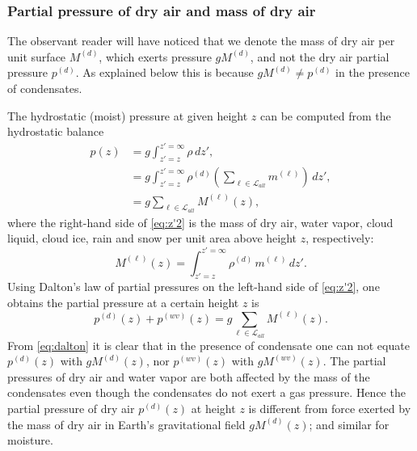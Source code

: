 \documentclass{agujournal}
\begin{document}
{\subsubsection{Partial pressure of dry air and mass of dry air}\label{sec:dryairp}
The observant reader will have noticed that we denote the mass of dry air per unit surface  $M^{(d)}$, which exerts pressure $gM^{(d)}$, and not the dry air partial pressure $p^{(d)}$. As explained below this is because $gM^{(d)}\neq p^{(d)}$ in the presence of condensates. 

The hydrostatic (moist) pressure at given height $z$ can be computed from the hydrostatic balance
\begin{align}
p(z)&=g\int^{z'=\infty}_{z'=z}\rho\, dz',\\
 &=g\int^{z'=\infty}_{z'=z}\rho^{(d)} \left( \sum_{\ell \in \mathcal{L}_{all}} m^{(\ell)} \right)\, dz',\\
 &=g\sum_{\ell \in \mathcal{L}_{all}} M^{(\ell)}(z),\label{eq:z'2}
\end{align}
where the right-hand side of \eqref{eq:z'2} is the mass of dry air, water vapor, cloud liquid, cloud ice, rain and snow per unit area above height $z$, respectively:
\begin{equation}
{M}^{(\ell)}(z)=\int^{z'=\infty}_{z'=z}\rho^{(d)} \, m^{(\ell)} \, dz'\label{eq:z'}.
\end{equation}
Using Dalton's law of partial pressures on the left-hand side of \eqref{eq:z'2}, one obtains the partial pressure at a certain height $z$ is
\begin{equation}
p^{(d)}(z)+p^{(wv)}(z)=g\sum_{\ell \in \mathcal{L}_{all}} {M}^{(\ell)}(z).\label{eq:dalton}
\end{equation}
From \eqref{eq:dalton} it is clear that in the presence of condensate one can not equate $p^{(d)}(z)$ with $g{M}^{(d)}(z)$, nor $p^{(wv)}(z)$ with $g{M}^{(wv)}(z)$. The partial pressures of dry air and water vapor are both affected by the mass of the condensates even though the condensates do not exert a gas pressure. Hence the partial pressure of dry air $p^{(d)}(z)$ at height $z$ is different from force exerted by the mass of dry air in Earth's gravitational field $gM^{(d)}(z)$; and similar for moisture. {\color{red}{A physical explanation is that when hydrometeors are falling at terminal velocity, the gravitational force pulling the hydrometeors downward is compensating by the upward frictional force of the gaseous atmosphere on the hydrometeors. This compensating force adds to the atmospheric pressure.}}

}
\end{document}

